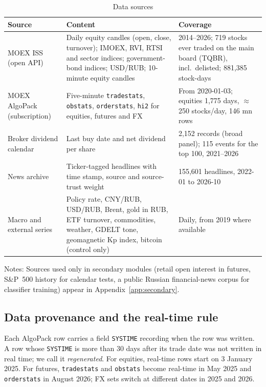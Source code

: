 \begin{table}[htbp]
\centering
\begin{threeparttable}
\caption{Data sources}\label{tab:data}
\small
\begin{tabularx}{\textwidth}{@{}R{3.3cm}LR{4.2cm}@{}}
\toprule
Source & Content & Coverage \\
\midrule
MOEX ISS (open API) & Daily equity candles (open, close, turnover); IMOEX, RVI, RTSI and sector indices; government-bond indices; USD/RUB; 10-minute equity candles & 2014--2026; 719 stocks ever traded on the main board (TQBR), incl.\ delisted; 881,385 stock-days \\
MOEX AlgoPack (subscription) & Five-minute \texttt{tradestats}, \texttt{obstats}, \texttt{orderstats}, \texttt{hi2} for equities, futures and FX & From 2020-01-03; equities 1,775 days, $\approx$250 stocks/day, 146 mn rows \\
Broker dividend calendar & Last buy date and net dividend per share & 2,152 records (broad panel); 115 events for the top 100, 2021--2026 \\
News archive & Ticker-tagged headlines with time stamp, source and source-trust weight & 155,601 headlines, 2022-01 to 2026-10 \\
Macro and external series & Policy rate, CNY/RUB, USD/RUB, Brent, gold in RUB, ETF turnover, commodities, weather, GDELT tone, geomagnetic Kp index, bitcoin (control only) & Daily, from 2019 where available \\
\bottomrule
\end{tabularx}
\begin{tablenotes}\footnotesize
\item Notes: Sources used only in secondary modules (retail open interest in futures, S\&P~500 history for calendar tests, a public Russian financial-news corpus for classifier training) appear in Appendix~\ref{app:secondary}.
\end{tablenotes}
\end{threeparttable}
\end{table}

\subsection{Data provenance and the real-time rule}\label{sec:provenance}

Each AlgoPack row carries a field \texttt{SYSTIME} recording when the row was written. A row whose \texttt{SYSTIME} is more than 30 days after its trade date was not written in real time; we call it \emph{regenerated}. For equities, real-time rows start on 3 January 2025. For futures, \texttt{tradestats} and \texttt{obstats} become real-time in May 2025 and \texttt{orderstats} in August 2026; FX sets switch at different dates in 2025 and 2026.

